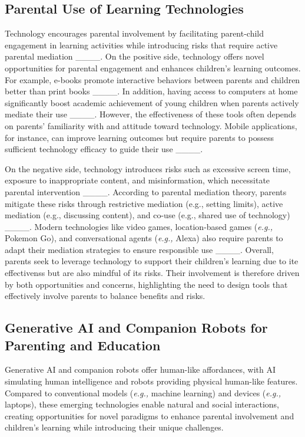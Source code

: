 \subsection{Parental Use of Learning Technologies}\label{sec-rw-2.2}
Technology encourages parental involvement by facilitating parent-child engagement in learning activities while introducing risks that require active parental mediation ____. On the positive side, technology offers novel opportunities for parental engagement and enhances children's learning outcomes. For example, e-books promote interactive behaviors between parents and children better than print books ____. In addition, having access to computers at home significantly boost academic achievement of young children when parents actively mediate their use ____. However, the effectiveness of these tools often depends on parents' familiarity with and attitude toward technology. Mobile applications, for instance, can improve learning outcomes but require parents to possess sufficient technology efficacy to guide their use ____.

On the negative side, technology introduces risks such as excessive screen time, exposure to inappropriate content, and misinformation, which necessitate parental intervention ____. According to parental mediation theory, parents mitigate these risks through restrictive mediation (e.g., setting limits), active mediation (e.g., discussing content), and co-use (e.g., shared use of technology) ____. Modern technologies like video games, location-based games (\textit{e.g.,} Pokemon Go), and conversational agents (\textit{e.g.,} Alexa) also require parents to adapt their mediation strategies to ensure responsible use ____. Overall, parents seek to leverage technology to support their children's learning due to ite effectivenss but are also mindful of its risks. Their involvement is therefore driven by both opportunities and concerns, highlighting the need to design tools that effectively involve parents to balance benefits and risks.

\subsection{Generative AI and Companion Robots for Parenting and Education}
Generative AI and companion robots offer human-like affordances, with AI simulating human intelligence and robots providing physical human-like features. Compared to conventional models (\textit{e.g.,} machine learning) and devices (\textit{e.g.,} laptops), these emerging technologies enable natural and social interactions, creating opportunities for novel paradigms to enhance parental involvement and children's learning while introducing their unique challenges.

